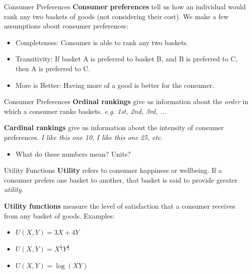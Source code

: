 \documentclass[12pt,t]{beamer}
\begin{document}
\begin{frame}{Consumer Preferences}
  \textbf{Consumer preferences} tell us how an individual would rank any two baskets of goods (not considering their cost). We make a few assumptions about consumer preferences:

  \bigskip
  \begin{itemize}
    \item Completeness: Consumer is able to rank any two baskets.
    \item Transitivity: If basket A is preferred to basket B, and B is preferred to C, then A is preferred to C.
    \item More is Better: Having more of a good is better for the consumer.
  \end{itemize}
\end{frame}

\begin{frame}{Consumer Preferences}
  \textbf{Ordinal rankings} give us information about the \textit{order} in which a consumer ranks baskets. \emph{e.g. 1st, 2nd, 3rd, ...}


  \pause\bigskip
  \textbf{Cardinal rankings} give us information about the intensity of consumer preferences. \emph{I like this one 10, I like this one 25, etc.}

  \begin{itemize}
    \item What do these numbers mean? Units?
  \end{itemize}
\end{frame}

\begin{frame}{Utility Functions}
  \textbf{Utility} refers to consumer happiness or wellbeing. If a consumer prefers one basket to another, that basket is said to provide greater \textit{utility}.
  
  \pause\bigskip
  \textbf{Utility functions} measure the level of satisfaction that a consumer receives from any basket of goods. Examples:
  \begin{itemize}
    \item $U(X,Y) = 3X + 4Y$
    \item $U(X,Y) = X^{\frac{1}{2}}Y^{\frac{1}{2}}$
    \item $U(X,Y) = \log(XY)$
  \end{itemize}
\end{frame}
\end{document}
